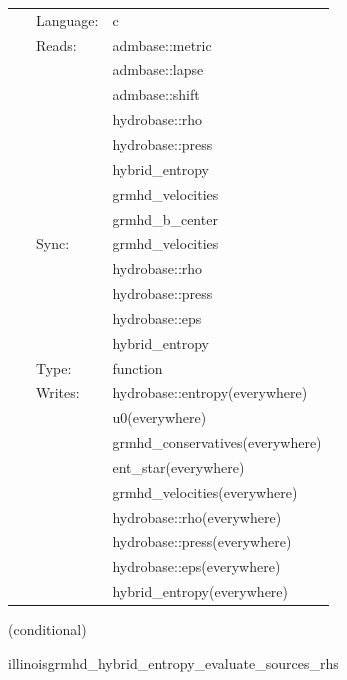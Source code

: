 \documentclass{article}
\begin{document}
 \begin{tabular*}{160mm}{cll} 
~ & Language:  & c \\ 
~ & Reads:  & admbase::metric \\ 
~& ~ &admbase::lapse\\ 
~& ~ &admbase::shift\\ 
~& ~ &hydrobase::rho\\ 
~& ~ &hydrobase::press\\ 
~& ~ &hybrid\_entropy\\ 
~& ~ &grmhd\_velocities\\ 
~& ~ &grmhd\_b\_center\\ 
~ & Sync:  & grmhd\_velocities \\ 
~& ~ &hydrobase::rho\\ 
~& ~ &hydrobase::press\\ 
~& ~ &hydrobase::eps\\ 
~& ~ &hybrid\_entropy\\ 
~ & Type:  & function \\ 
~ & Writes:  & hydrobase::entropy(everywhere) \\ 
~& ~ &u0(everywhere)\\ 
~& ~ &grmhd\_conservatives(everywhere)\\ 
~& ~ &ent\_star(everywhere)\\ 
~& ~ &grmhd\_velocities(everywhere)\\ 
~& ~ &hydrobase::rho(everywhere)\\ 
~& ~ &hydrobase::press(everywhere)\\ 
~& ~ &hydrobase::eps(everywhere)\\ 
~& ~ &hybrid\_entropy(everywhere)\\ 
\end{tabular*} 


\vspace{5mm}

   (conditional) 

\hspace{5mm} illinoisgrmhd\_hybrid\_entropy\_evaluate\_sources\_rhs 

\hspace{5mm}{\it entropy+hybrid version of illinoisgrmhd\_evaluate\_sources\_rhs } 


\hspace{5mm}
\end{document}
